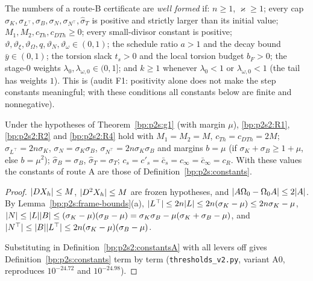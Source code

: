 \begin{definition}\label{bp:p2s2:data-ok}
The numbers of a route-B certificate are \emph{well formed} if: $n\ge1$, $\varkappa\ge1$; every cap $\sigma_K,\sigma_{L^\top},\sigma_B,\sigma_N,\sigma_{N^\top},
\hat\sigma_T$ is positive and strictly larger than its initial value; $M_1,M_2,c_{Th},c_{DTh}\ge0$; every small-divisor constant is positive;
$\vartheta,\vartheta_\xi,\vartheta_\Omega,q,\vartheta_N,\vartheta_\omega\in(0,1)$; the schedule ratio $a>1$ and the decay bound $\bar y\in(0,1)$; the
torsion slack $t_s>0$ and the local torsion budget $b_F>0$; the stage-$0$ weights $\lambda_0,\lambda_{\omega,0}\in(0,1]$; and $k\ge1$ whenever
$\lambda_0<1$ or $\lambda_{\omega,0}<1$ (the tail has weights $1$). This is  (audit F1: positivity alone does not make the
step constants meaningful; with these conditions all constants below are finite and nonnegative).
\end{definition}

\begin{lemma}\label{bp:p2s2:defaults}
Under the hypotheses of Theorem~\ref{bp:p2s:g1} (with margin $\mu$), \ref{bp:p2s2:R1}, \ref{bp:p2s2:R2} and \ref{bp:p2s2:R4} hold with
$M_1=M_2=M$, $c_{Th}=c_{DTh}=2M$; $\sigma_{L^\top}=2n\sigma_K$, $\sigma_N=\sigma_K\sigma_B$, $\sigma_{N^\top}=2n\sigma_K\sigma_B$ and margins $b=\mu$ (if
$\sigma_K+\sigma_B\ge1+\mu$, else $b=\mu^2$); $\hat\sigma_B=\sigma_B$, $\hat\sigma_T=\sigma_T$; $c_s=c'_s=\bar c_s=c_\infty=\bar c_\infty=c_R$. With these values the
constants of route A are those of Definition~\ref{bp:p2s:constants}.
\end{lemma}

\begin{proof}
\label{step:p2s2:def-b}
$\lvert DX_h\rvert\le M$, $\lvert D^2X_h\rvert\le M$ are frozen hypotheses, and $\lvert A\Omega_0-\Omega_0A\rvert\le2\lvert A\rvert$. By Lemma~\ref{bp:p2s:frame-bounds}(a),
$\lvert L^\top\rvert\le2n\lvert L\rvert\le2n(\sigma_K-\mu)\le2n\sigma_K-\mu$, $\lvert N\rvert\le\lvert L\rvert\lvert B\rvert\le(\sigma_K-\mu)(\sigma_B-\mu)=\sigma_K\sigma_B-\mu(\sigma_K+\sigma_B-\mu)$, and
$\lvert N^\top\rvert\le\lvert B\rvert\lvert L^\top\rvert\le2n(\sigma_K-\mu)(\sigma_B-\mu)$.

\label{step:p2s2:def-c}
Substituting in Definition~\ref{bp:p2s2:constantsA} with all levers off gives Definition~\ref{bp:p2s:constants} term by term
(\texttt{thresholds\_v2.py}, variant A0, reproduces $10^{-24.72}$ and $10^{-24.98}$).
\end{proof}

